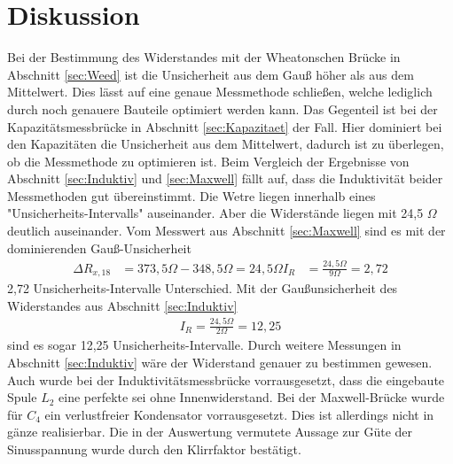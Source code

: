 \section{Diskussion}
\label{sec:Diskussion}
Bei der Bestimmung des Widerstandes mit der Wheatonschen Brücke in Abschnitt \ref{sec:Weed} ist die Unsicherheit aus dem Gauß höher als aus dem Mittelwert.
Dies lässt auf eine genaue Messmethode schließen, welche lediglich durch noch genauere Bauteile optimiert werden kann.
Das Gegenteil ist bei der Kapazitätsmessbrücke in Abschnitt \ref{sec:Kapazitaet} der Fall.
Hier dominiert bei den Kapazitäten die Unsicherheit aus dem Mittelwert, dadurch ist zu überlegen, ob die Messmethode zu optimieren ist.
Beim Vergleich der Ergebnisse von Abschnitt \ref{sec:Induktiv} und \ref{sec:Maxwell} fällt auf, dass die Induktivität beider Messmethoden gut übereinstimmt.
Die Wetre liegen innerhalb eines "Unsicherheits-Intervalls" auseinander.
Aber die Widerstände liegen mit 24,5 $\Omega$ deutlich auseinander.
Vom Messwert aus Abschnitt \ref{sec:Maxwell} sind es mit der dominierenden Gauß-Unsicherheit
\begin{align}
    \Delta R_{x,18} &= 373,5 \Omega - 348,5 \Omega = 24,5 \Omega
    I_R &= \frac{24,5 \Omega}{9 \Omega} =2,72
\end{align}
2,72 Unsicherheits-Intervalle Unterschied.
Mit der Gaußunsicherheit des Widerstandes aus Abschnitt \ref{sec:Induktiv}
\begin{align}
    I_R = \frac{24,5 \Omega}{2 \Omega} = 12,25
\end{align}
sind es sogar 12,25 Unsicherheits-Intervalle.
Durch weitere Messungen in Abschnitt \ref{sec:Induktiv} wäre der Widerstand genauer zu bestimmen gewesen.
Auch wurde bei der Induktivitätsmessbrücke vorrausgesetzt, dass die eingebaute Spule $L_2$ eine perfekte sei ohne Innenwiderstand.
Bei der Maxwell-Brücke wurde für $C_4$ ein verlustfreier Kondensator vorrausgesetzt.
Dies ist allerdings nicht in gänze realisierbar.
Die in der Auswertung vermutete Aussage zur Güte der Sinusspannung wurde durch den Klirrfaktor bestätigt.